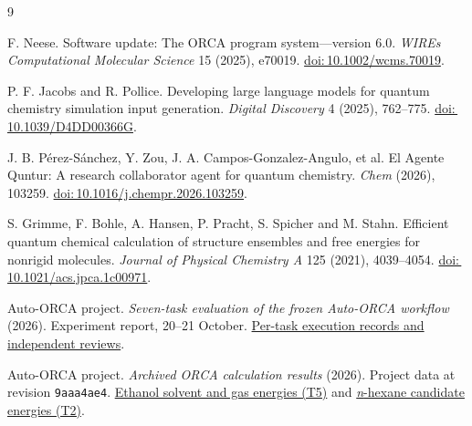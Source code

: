\documentclass[12pt,a4paper]{article}
\newcommand{\doi}[1]{\href{https://doi.org/#1}{doi:\,#1}}
\newcommand{\archivebase}{https://github.com/az87988799/BG6022-v4/blob/9aaa4ae40dabe83ef496f71b4434f7f4987b2089}
\begin{document}
\clearpage
\renewcommand{\bibsection}{\section{References}}
\setlength{\bibsep}{0.65em}
\begin{thebibliography}{9}
\raggedright
{}
F. Neese. Software update: The ORCA program system---version 6.0.
\emph{WIREs Computational Molecular Science} 15 (2025), e70019.
\doi{10.1002/wcms.70019}.

P. F. Jacobs and R. Pollice. Developing large language models for quantum
chemistry simulation input generation. \emph{Digital Discovery} 4 (2025),
762--775. \doi{10.1039/D4DD00366G}.

J. B. P\'erez-S\'anchez, Y. Zou, J. A. Campos-Gonzalez-Angulo, et al.
El Agente Quntur: A research collaborator agent for quantum chemistry.
\emph{Chem} (2026), 103259. \doi{10.1016/j.chempr.2026.103259}.

S. Grimme, F. Bohle, A. Hansen, P. Pracht, S. Spicher and M. Stahn.
Efficient quantum chemical calculation of structure ensembles and free
energies for nonrigid molecules. \emph{Journal of Physical Chemistry A}
125 (2021), 4039--4054. \doi{10.1021/acs.jpca.1c00971}.

Auto-ORCA project. \emph{Seven-task evaluation of the frozen Auto-ORCA
workflow} (2026). Experiment report, 20--21 October.
\href{\archivebase/docs/acceptance/code-as-tools-step7-refreeze-3/report.md}
{Per-task execution records and independent reviews}.

Auto-ORCA project. \emph{Archived ORCA calculation results} (2026).
Project data at revision \texttt{9aaa4ae4}.
\href{\archivebase/FinalReport-LaTeX/data/T5-environments.csv}{Ethanol
solvent and gas energies (T5)} and
\href{\archivebase/FinalReport-LaTeX/data/T2-candidates.csv}{\emph{n}-hexane
candidate energies (T2)}.
\end{thebibliography}
\end{document}
